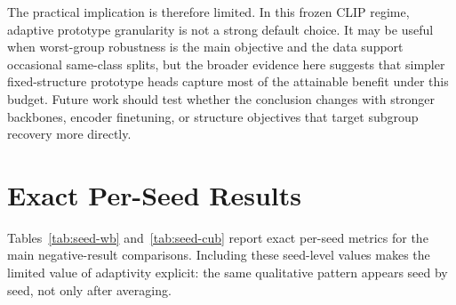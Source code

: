 \documentclass[10pt,twocolumn]{article}
\begin{document}
The practical implication is therefore limited. In this frozen CLIP regime, adaptive prototype granularity is not a strong default choice. It may be useful when worst-group robustness is the main objective and the data support occasional same-class splits, but the broader evidence here suggests that simpler fixed-structure prototype heads capture most of the attainable benefit under this budget. Future work should test whether the conclusion changes with stronger backbones, encoder finetuning, or structure objectives that target subgroup recovery more directly.




\appendix

\section{Exact Per-Seed Results}
\label{sec:appendix-seeds}
Tables~\ref{tab:seed-wb} and~\ref{tab:seed-cub} report exact per-seed metrics for the main negative-result comparisons. Including these seed-level values makes the limited value of adaptivity explicit: the same qualitative pattern appears seed by seed, not only after averaging.

\begin{table}[t]
\caption{Exact per-seed Waterbirds results for the strongest comparison points. Metrics are reported as percentages.}
\label{tab:seed-wb}
\centering
\small

\end{table}

\begin{table}[t]
\caption{Exact per-seed CUB results for the strongest comparison points. Metrics are reported as percentages.}
\label{tab:seed-cub}
\centering
\small

\end{table}
\end{document}
